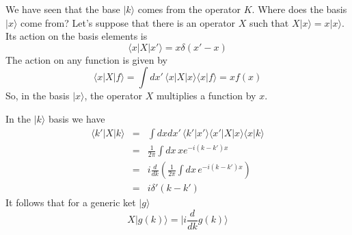 \documentclass[11pt,fleqn]{book} %
\newcommand{\bra}[1]{\langle #1|}
\newcommand{\ket}[1]{| #1\rangle}
\newcommand{\scalar}[2]{\langle #1| #2\rangle}
\begin{document}
We have seen that the base $\ket{k}$ comes from the operator $K$. Where does the basis $\ket{x}$ come from?
Let's suppose that there is an operator $X$ such that $X\ket{x} = x\ket{x}$. Its action on the basis elements is
\begin{equation*}
    \bra{x}X\ket{x'} = x\delta(x'-x)
\end{equation*}
The action on any function is given by
\begin{equation*}
    \bra{x}X\ket{f} = \int\!\!dx'\,\bra{x}X\ket{x}\scalar{x}{f} = xf(x)
\end{equation*}
So, in the basis $\ket{x}$, the operator $X$ multiplies a function by $x$.

In the $\ket{k}$ basis we have
\begin{eqnarray*}
    \bra{k'}X\ket{k} &=& \int\!\!dxdx'\,\scalar{k'}{x'}\bra{x'}X\ket{x}\scalar{x}{k} \\
    &=& \frac{1}{2\pi}\int\!\!dx\,xe^{-i(k-k')x} \\
    &=& i\frac{d}{dk}\left(\frac{1}{2\pi}\int\!\!dx\,e^{-i(k-k')x}\right)\\
    &=& i\delta'(k-k')
\end{eqnarray*}
It follows that for a generic ket $\ket{g}$
\begin{equation*}
    X\ket{g(k)} = \ket{i\frac{d}{dk}g(k)}
\end{equation*}
\end{document}
